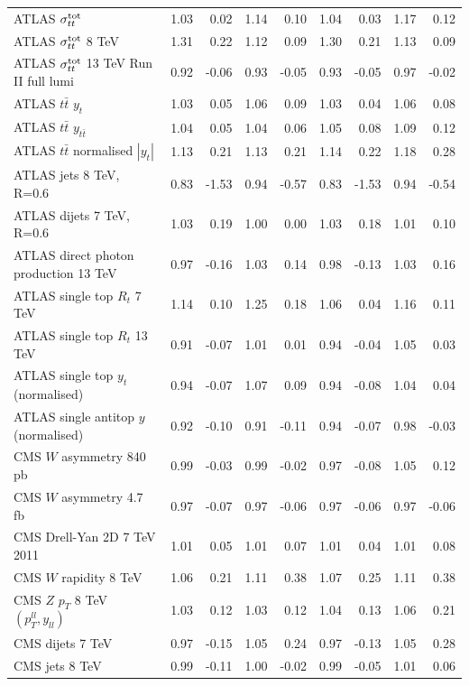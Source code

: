 \documentclass[withindex,glossary]{cam-thesis}
\begin{document}
\begin{table}[H]
\begin{tabular}{lrrrrrrrr}
ATLAS $\sigma_{tt}^{\rm tot}$ & 1.03 & 0.02 & 1.14 & 0.10 & 1.04 & 0.03 & 1.17 & 0.12 \\
ATLAS $\sigma_{tt}^{\rm tot}$ 8 TeV & 1.31 & 0.22 & 1.12 & 0.09 & 1.30 & 0.21 & 1.13 & 0.09 \\
ATLAS $\sigma_{tt}^{\rm tot}$ 13 TeV Run II full lumi & 0.92 & -0.06 & 0.93 & -0.05 & 0.93 & -0.05 & 0.97 & -0.02 \\
ATLAS $t\bar{t}$ $y_t$ & 1.03 & 0.05 & 1.06 & 0.09 & 1.03 & 0.04 & 1.06 & 0.08 \\
ATLAS $t\bar{t}$ $y_{t\bar{t}}$ & 1.04 & 0.05 & 1.04 & 0.06 & 1.05 & 0.08 & 1.09 & 0.12 \\
ATLAS $t\bar{t}$ normalised $|y_t|$ & 1.13 & 0.21 & 1.13 & 0.21 & 1.14 & 0.22 & 1.18 & 0.28 \\
ATLAS jets 8 TeV, R=0.6 & 0.83 & -1.53 & 0.94 & -0.57 & 0.83 & -1.53 & 0.94 & -0.54 \\
ATLAS dijets 7 TeV, R=0.6 & 1.03 & 0.19 & 1.00 & 0.00 & 1.03 & 0.18 & 1.01 & 0.10 \\
ATLAS direct photon production 13 TeV & 0.97 & -0.16 & 1.03 & 0.14 & 0.98 & -0.13 & 1.03 & 0.16 \\
ATLAS single top $R_{t}$ 7 TeV & 1.14 & 0.10 & 1.25 & 0.18 & 1.06 & 0.04 & 1.16 & 0.11 \\
ATLAS single top $R_{t}$ 13 TeV & 0.91 & -0.07 & 1.01 & 0.01 & 0.94 & -0.04 & 1.05 & 0.03 \\
ATLAS single top $y_t$ (normalised) & 0.94 & -0.07 & 1.07 & 0.09 & 0.94 & -0.08 & 1.04 & 0.04 \\
ATLAS single antitop $y$ (normalised) & 0.92 & -0.10 & 0.91 & -0.11 & 0.94 & -0.07 & 0.98 & -0.03 \\
CMS $W$ asymmetry 840 pb & 0.99 & -0.03 & 0.99 & -0.02 & 0.97 & -0.08 & 1.05 & 0.12 \\
CMS $W$ asymmetry 4.7 fb & 0.97 & -0.07 & 0.97 & -0.06 & 0.97 & -0.06 & 0.97 & -0.06 \\
CMS Drell-Yan 2D 7 TeV 2011 & 1.01 & 0.05 & 1.01 & 0.07 & 1.01 & 0.04 & 1.01 & 0.08 \\
CMS $W$ rapidity 8 TeV & 1.06 & 0.21 & 1.11 & 0.38 & 1.07 & 0.25 & 1.11 & 0.38 \\
CMS $Z$ $p_T$ 8 TeV $(p_T^{ll},y_{ll})$ & 1.03 & 0.12 & 1.03 & 0.12 & 1.04 & 0.13 & 1.06 & 0.21 \\
CMS dijets 7 TeV & 0.97 & -0.15 & 1.05 & 0.24 & 0.97 & -0.13 & 1.05 & 0.28 \\
CMS jets 8 TeV & 0.99 & -0.11 & 1.00 & -0.02 & 0.99 & -0.05 & 1.01 & 0.06 \\

\end{tabular}
\end{table}
\end{document}
